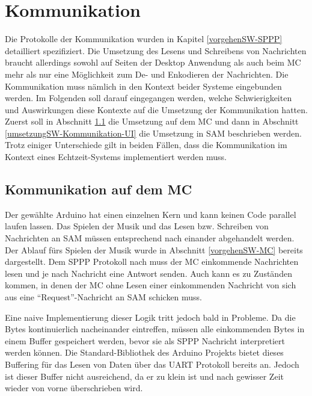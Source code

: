 


\section{Kommunikation} \label{umsetzungSW-Kommunikation}

Die Protokolle der Kommunikation wurden in Kapitel \ref{vorgehenSW-SPPP} detailliert spezifiziert.
Die Umsetzung des Lesens und Schreibens von Nachrichten braucht allerdings sowohl auf Seiten der Desktop Anwendung als auch beim \ac{MC} mehr als nur eine Möglichkeit zum De- und Enkodieren der Nachrichten.
Die Kommunikation muss nämlich in den Kontext beider Systeme eingebunden werden.
Im Folgenden soll darauf eingegangen werden, welche Schwierigkeiten und Auswirkungen diese Kontexte auf die Umsetzung der Kommunikation hatten.
Zuerst soll in Abschnitt \ref{umsetzungSW-Kommunikation-MC} die Umsetzung auf dem \ac{MC} und dann in Abschnitt \ref{umsetzungSW-Kommunikation-UI} die Umsetzung in \ac{SAM} beschrieben werden.
Trotz einiger Unterschiede gilt in beiden Fällen, dass die Kommunikation im Kontext eines Echtzeit-Systems implementiert werden muss.

\subsection{Kommunikation auf dem \ac{MC}} \label{umsetzungSW-Kommunikation-MC}

Der gewählte Arduino hat einen einzelnen Kern und kann keinen Code parallel laufen lassen.
Das Spielen der Musik und das Lesen bzw. Schreiben von Nachrichten an \ac{SAM} müssen entsprechend nach einander abgehandelt werden.
Der Ablauf fürs Spielen der Musik wurde in Abschnitt \ref{vorgehenSW-MC} bereits dargestellt.
Dem \ac{SPPP} Protokoll nach muss der \ac{MC} einkommende Nachrichten lesen und je nach Nachricht eine Antwort senden.
Auch kann es zu Zuständen kommen, in denen der \ac{MC} ohne Lesen einer einkommenden Nachricht von sich aus eine \enquote{Request}-Nachricht an \ac{SAM} schicken muss.

Eine naive Implementierung dieser Logik tritt jedoch bald in Probleme.
Da die Bytes kontinuierlich nacheinander eintreffen, müssen alle einkommenden Bytes in einem Buffer gespeichert werden, bevor sie als \ac{SPPP} Nachricht interpretiert werden können.
Die Standard-Bibliothek des Arduino Projekts bietet dieses Buffering für das Lesen von Daten über das \ac{UART} Protokoll bereits an.
Jedoch ist dieser Buffer nicht ausreichend, da er zu klein ist und nach gewisser Zeit wieder von vorne überschrieben wird. %


